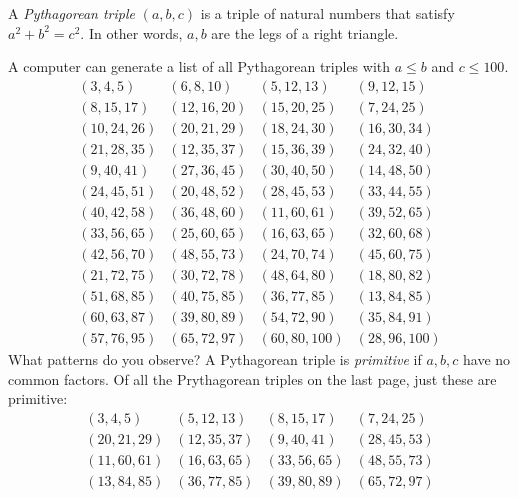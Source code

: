 \documentclass[12pt]{exam}
\begin{document}
\begin{questions}
  \question A \emph{Pythagorean triple} $(a,b,c)$ is a triple of natural numbers that satisfy $a^2+b^2=c^2$. In other words, $a,b$ are the legs of a right triangle.
  
  A computer can generate a list of all Pythagorean triples with $a\leq b$ and $c\leq100$.
  \begin{equation*}
    \begin{array}{llll}
      ( 3, 4, 5) & ( 6, 8,10) & ( 5,12, 13) & ( 9,12, 15) \\ 
      ( 8,15,17) & (12,16,20) & (15,20, 25) & ( 7,24, 25) \\ 
      (10,24,26) & (20,21,29) & (18,24, 30) & (16,30, 34) \\ 
      (21,28,35) & (12,35,37) & (15,36, 39) & (24,32, 40) \\ 
      ( 9,40,41) & (27,36,45) & (30,40, 50) & (14,48, 50) \\ 
      (24,45,51) & (20,48,52) & (28,45, 53) & (33,44, 55) \\ 
      (40,42,58) & (36,48,60) & (11,60, 61) & (39,52, 65) \\ 
      (33,56,65) & (25,60,65) & (16,63, 65) & (32,60, 68) \\ 
      (42,56,70) & (48,55,73) & (24,70, 74) & (45,60, 75) \\ 
      (21,72,75) & (30,72,78) & (48,64, 80) & (18,80, 82) \\ 
      (51,68,85) & (40,75,85) & (36,77, 85) & (13,84, 85) \\ 
      (60,63,87) & (39,80,89) & (54,72, 90) & (35,84, 91) \\ 
      (57,76,95) & (65,72,97) & (60,80,100) & (28,96,100)
    \end{array}
  \end{equation*}
  What patterns do you observe?
  \newpage
  \question A Pythagorean triple is \emph{primitive} if $a,b,c$ have no common factors. Of all the Prythagorean triples on the last page, just these are primitive:
  \begin{equation*}
    \begin{array}{llll}
      ( 3, 4, 5) & ( 5,12,13) & ( 8,15,17) & ( 7,24,25) \\
      (20,21,29) & (12,35,37) & ( 9,40,41) & (28,45,53) \\
      (11,60,61) & (16,63,65) & (33,56,65) & (48,55,73) \\
      (13,84,85) & (36,77,85) & (39,80,89) & (65,72,97) \\

\end{array}
\end{equation*}
\end{questions}
\end{document}
